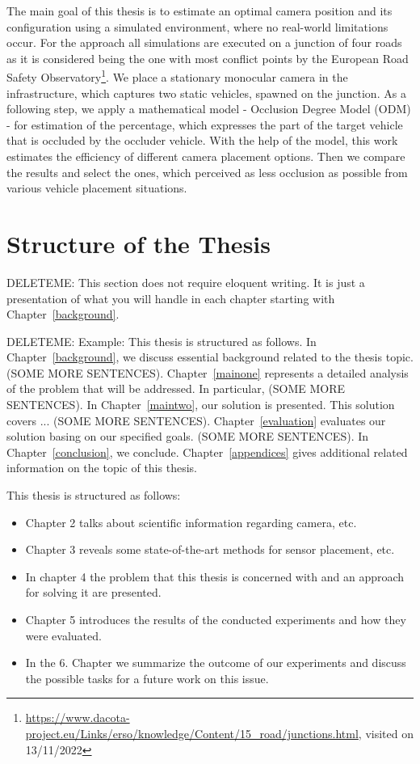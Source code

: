 The main goal of this thesis is to estimate an optimal camera position and its configuration using a simulated environment, where no real-world limitations occur. For the approach all simulations are executed on a junction of four roads as it is considered being the one with most conflict points by the European Road Safety Observatory\footnote{\url{https://www.dacota-project.eu/Links/erso/knowledge/Content/15_road/junctions.html}, visited on 13/11/2022}. We place a stationary monocular camera in the infrastructure, which captures two static vehicles, spawned on the junction. As a following step, we apply a mathematical model - Occlusion Degree Model (ODM) \cite{occlusion_degree_model} - for estimation of the percentage, which expresses the part of the target vehicle that is occluded by the occluder vehicle. With the help of the model, this work estimates the efficiency of different camera placement options. Then we compare the results and select the ones, which perceived as less occlusion as possible from various vehicle placement situations. 


\section{Structure of the Thesis}
DELETEME: This section does not require eloquent writing. It is just a presentation of what you will handle in each chapter starting with Chapter~\ref{background}.

DELETEME: Example: This thesis is structured as follows. In Chapter~\ref{background}, we discuss essential background related to the thesis topic. (SOME MORE SENTENCES). Chapter~\ref{mainone} represents a detailed analysis of the problem that will be addressed. In particular, (SOME MORE SENTENCES). In Chapter~\ref{maintwo}, our solution is presented. This solution covers ... (SOME MORE SENTENCES). Chapter~\ref{evaluation} evaluates our solution basing on our specified goals. (SOME MORE SENTENCES). In Chapter~\ref{conclusion}, we conclude. Chapter~\ref{appendices} gives additional related information on the topic of this thesis.

This thesis is structured as follows: 
\begin{itemize}
    \item Chapter 2 talks about scientific information regarding camera, etc.
    \item Chapter 3 reveals some state-of-the-art methods for sensor placement, etc.
    \item In chapter 4 the problem that this thesis is concerned with and an approach for solving it are presented.
    \item Chapter 5 introduces the results of the conducted experiments and how they were evaluated.
    \item In the 6. Chapter we summarize the outcome of our experiments and discuss the possible tasks for a future work on this issue.
\end{itemize} 
